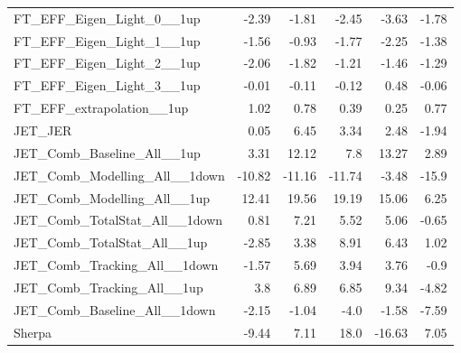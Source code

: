 \begin{table}[htbp]
{\begin{tabular}{lrrrrr}
FT\_EFF\_Eigen\_Light\_0\_\_1up    & -2.39              & -1.81                & -2.45                & -3.63                & -1.78                \\
FT\_EFF\_Eigen\_Light\_1\_\_1up    & -1.56              & -0.93                & -1.77                & -2.25                & -1.38                \\
FT\_EFF\_Eigen\_Light\_2\_\_1up    & -2.06              & -1.82                & -1.21                & -1.46                & -1.29                \\
FT\_EFF\_Eigen\_Light\_3\_\_1up    & -0.01              & -0.11                & -0.12                & 0.48                 & -0.06                \\
FT\_EFF\_extrapolation\_\_1up      & 1.02               & 0.78                 & 0.39                 & 0.25                 & 0.77                 \\
JET\_JER                           & 0.05               & 6.45                 & 3.34                 & 2.48                 & -1.94                \\
JET\_Comb\_Baseline\_All\_\_1up    & 3.31               & 12.12                & 7.8                  & 13.27                & 2.89                 \\
JET\_Comb\_Modelling\_All\_\_1down & -10.82             & -11.16               & -11.74               & -3.48                & -15.9                \\
JET\_Comb\_Modelling\_All\_\_1up   & 12.41              & 19.56                & 19.19                & 15.06                & 6.25                 \\
JET\_Comb\_TotalStat\_All\_\_1down & 0.81               & 7.21                 & 5.52                 & 5.06                 & -0.65                \\
JET\_Comb\_TotalStat\_All\_\_1up   & -2.85              & 3.38                 & 8.91                 & 6.43                 & 1.02                 \\
JET\_Comb\_Tracking\_All\_\_1down  & -1.57              & 5.69                 & 3.94                 & 3.76                 & -0.9                 \\
JET\_Comb\_Tracking\_All\_\_1up    & 3.8                & 6.89                 & 6.85                 & 9.34                 & -4.82                \\
JET\_Comb\_Baseline\_All\_\_1down  & -2.15              & -1.04                & -4.0                 & -1.58                & -7.59                \\
Sherpa                             & -9.44              & 7.11                 & 18.0                 & -16.63               & 7.05                 \\
\end{tabular}}
\end{table}

\clearpage

